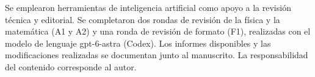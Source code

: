 Se emplearon herramientas de inteligencia artificial como apoyo a la revisión técnica y editorial. Se completaron dos rondas de revisión de la física y la matemática (A1 y A2) y una ronda de revisión de formato (F1), realizadas con el modelo de lenguaje gpt-6-astra (Codex). Los informes disponibles y las modificaciones realizadas se documentan junto al manuscrito. La responsabilidad del contenido corresponde al autor.
